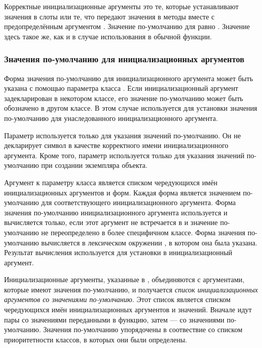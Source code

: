 Корректные инициализационные аргументы это те, которые устанавливают значения в
слоты или те, что передают значения в методы вместе с предопределённым
аргументом . Значение по-умолчанию для
 равно . Значение  здесь
такое же, как и в случае использования в обычной функции.

\subsubsection{Значения по-умолчанию для инициализационных аргументов}
\label{DEFAULTING-INITIALIZATION-ARGUMENTS}

Форма значения по-умолчанию для инициализационного аргумента может быть указана
с помощью параметра класса . Если инициализационный
аргумент задекларирован в некотором классе, его значение по-умолчанию может быть
обозначено в другом классе. В этом случае  используется
для установки значения по-умолчанию для унаследованного инициализационного
аргумента.

Параметр  используется только для указания значений
по-умолчанию. Он не декларирует символ в качестве корректного имени
инициализационного аргумента. Кроме того, параметр 
используется только для указания значений по-умолчанию при создании экземпляра
объекта.

Аргумент к параметру класса  является списком чередующихся
имён инициализационных аргументов и форм. Каждая форма является значением
по-умолчанию для соответствующего инициализационного аргумента. Форма значения
по-умолчанию инициализационного аргумента используется и вычисляется только,
если этот аргумент не встречается в  и значение по-умолчанию
не переопределено в более специфичном классе. Форма значения по-умолчанию
вычисляется в лексическом окружении , в котором она была
указана. Результат вычисления используется для установки в инициализационный
аргумент.

Инициализационные аргументы, указанные в , объединяются с
аргументами, которые имеют значения по-умолчанию, и получается \emph{список
  инициализационных аргументов со значениями по-умолчанию}. Этот список является
списком чередующихся имён инициализационных аргументов и значений. Вначале идут
пары со значениями переданными в функцию, затем --- со значениями
по-умолчанию. Значения по-умолчанию упорядочены в соотвествие со списком
приоритетности классов, в которых они были определены.

